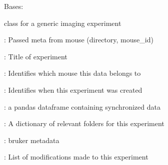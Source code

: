 \documentclass[letterpaper,10pt,english]{sphinxmanual}
\begin{document}
\begin{fulllineitems}
\label{\detokenize{Organization:Organization.ImagingExperiment}}
\pysigstartsignatures
{}
\pysigstopsignatures
\sphinxAtStartPar
Bases: {\hyperref[\detokenize{Organization:Organization.Experiment}]{}}

\sphinxAtStartPar
{} class for a generic imaging experiment
\begin{description}
\begin{DUlineblock}{0em}
\item[]  : Passed meta from mouse  (directory, mouse\_id)
\item[]  : Title of experiment
\end{DUlineblock}

\begin{DUlineblock}{0em}
\item[]  : Identifies which mouse this data belongs to
\item[]  : Identifies when this experiment was created
\end{DUlineblock}

\begin{DUlineblock}{0em}
\item[]  : a pandas dataframe containing synchronized data
\item[]  : A dictionary of relevant folders for this experiment
\item[]  : bruker metadata
\item[]  : List of modifications made to this experiment
\end{DUlineblock}


\end{description}
\end{fulllineitems}
\end{document}
